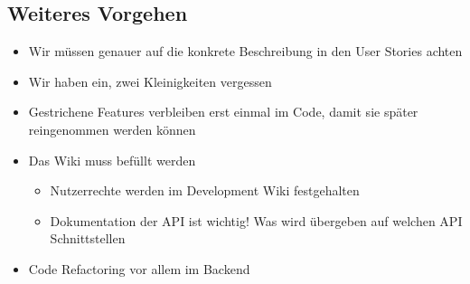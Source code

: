 \documentclass[colorback, accentcolor=tud1c, paper=a4]{tudexercise}
\begin{document}
\begin{multicols}{2}
\subsection*{Weiteres Vorgehen}
\begin{itemize}
	\item Wir müssen genauer auf die konkrete Beschreibung in den User Stories achten
	\item Wir haben ein, zwei Kleinigkeiten vergessen
	\item Gestrichene Features verbleiben erst einmal im Code, damit sie später reingenommen werden können
	\item Das Wiki muss befüllt werden
	\begin{itemize}
		\item Nutzerrechte werden im Development Wiki festgehalten
		\item Dokumentation der API ist wichtig! Was wird übergeben auf welchen API Schnittstellen
	\end{itemize}
	\item Code Refactoring vor allem im Backend
\end{itemize}
\end{multicols}
	
\end{document}
